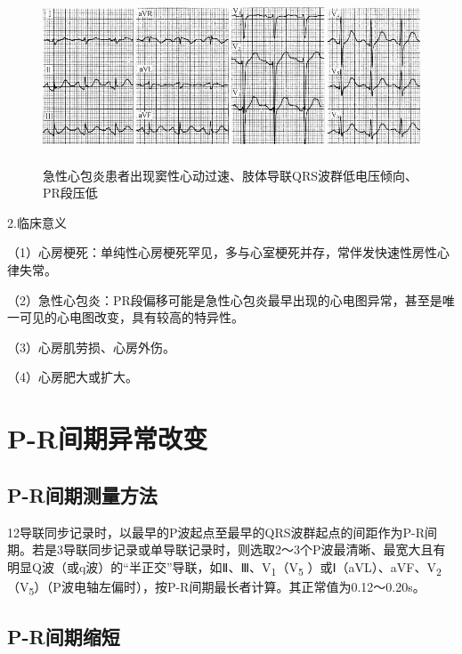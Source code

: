 \begin{figure}[!htbp]
 \centering
 \includegraphics[width=5.58333in,height=2.04167in]{./images/Image00036.jpg}
 \captionsetup{justification=centering}
 \caption{急性心包炎患者出现窦性心动过速、肢体导联QRS波群低电压倾向、PR段压低}
 \label{fig2-1}
  \end{figure} 

2.临床意义

（1）心房梗死：单纯性心房梗死罕见，多与心室梗死并存，常伴发快速性房性心律失常。

（2）急性心包炎：PR段偏移可能是急性心包炎最早出现的心电图异常，甚至是唯一可见的心电图改变，具有较高的特异性。

（3）心房肌劳损、心房外伤。

（4）心房肥大或扩大。

\protect\hypertarget{text00008.htmlux5cux23subid29}{}{}

\section{P-R间期异常改变}

\protect\hypertarget{text00008.htmlux5cux23subid30}{}{}

\subsection{P-R间期测量方法}

12导联同步记录时，以最早的P波起点至最早的QRS波群起点的间距作为P-R间期。若是3导联同步记录或单导联记录时，则选取2～3个P波最清晰、最宽大且有明显Q波（或q波）的“半正交”导联，如Ⅱ、Ⅲ、V\textsubscript{1}（V\textsubscript{5} ）或Ⅰ（aVL）、aVF、V\textsubscript{2}（V\textsubscript{5}）（P波电轴左偏时），按P-R间期最长者计算。其正常值为0.12～0.20s。

\protect\hypertarget{text00008.htmlux5cux23subid31}{}{}

\subsection{P-R间期缩短}

